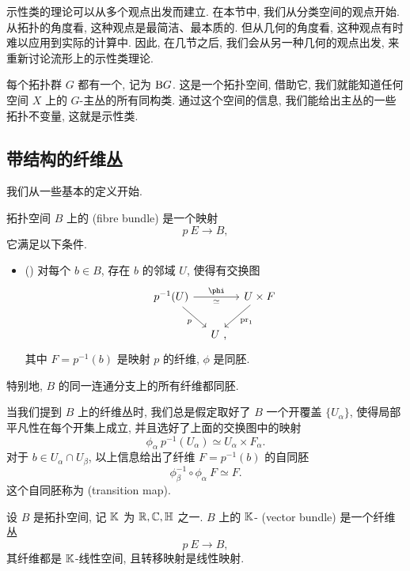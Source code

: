 示性类的理论可以从多个观点出发而建立. 在本节中, 我们从分类空间的观点开始.
从拓扑的角度看, 这种观点是最简洁、最本质的.
但从几何的角度看, 这种观点有时难以应用到实际的计算中.
因此, 在几节之后, 我们会从另一种几何的观点出发, 来重新讨论流形上的示性类理论.

每个拓扑群 $G$ 都有一个, 记为 $\mathrm{B} G$.
这是一个拓扑空间, 借助它, 我们就能知道任何空间 $X$ 上的 $G$-主丛的所有同构类.
通过这个空间的信息, 我们能给出主丛的一些拓扑不变量, 这就是示性类.

\subsection{带结构的纤维丛}

我们从一些基本的定义开始. 

\begin{definition}
    拓扑空间 $B$ 上的 (fibre bundle)
    是一个映射
    \[ p \: E \to B, \]
    它满足以下条件.
    \begin{itemize}
        \item 
            ()
            对每个 $b \in B$, 存在 $b$ 的邻域 $U$,
            使得有交换图
            \[ \begin{tikzcd}[column sep={4em,between origins}]
                p^{-1}(U) \ar[rr, "\phi", "\simeq"'] \ar[dr, "p"'] &&
                U \times F \ar[dl, "\operatorname{pr}_1"] \\
                & U \rlap{\ ,}
            \end{tikzcd} \]
            其中 $F = p^{-1}(b)$ 是映射 $p$ 的纤维, $\phi$ 是同胚.
    \end{itemize}
    特别地, $B$ 的同一连通分支上的所有纤维都同胚. 
\end{definition}

当我们提到 $B$ 上的纤维丛时,
我们总是假定取好了 $B$ 一个开覆盖 $\{ U_\alpha \}$,
使得局部平凡性在每个开集上成立,
并且选好了上面的交换图中的映射
\[ \phi_\alpha \: p^{-1}(U_\alpha) \simeq U_\alpha \times F_\alpha. \]
对于 $b \in U_\alpha \cap U_\beta$,
以上信息给出了纤维 $F = p^{-1}(b)$ 的自同胚
\[ \phi_\beta^{-1} \circ \phi_\alpha \: F \simeq F. \]
这个自同胚称为 (transition map).

\begin{definition}
    设 $B$ 是拓扑空间, 记 $\mathbb{K}$ 为 $\mathbb{R}, \mathbb{C}, \mathbb{H}$ 之一. 
    $B$ 上的 $\mathbb{K}$- (vector bundle) 是一个纤维丛
    \[ p \: E \to B, \]
    其纤维都是 $\mathbb{K}$-线性空间, 
    且转移映射是线性映射. 
\end{definition}

